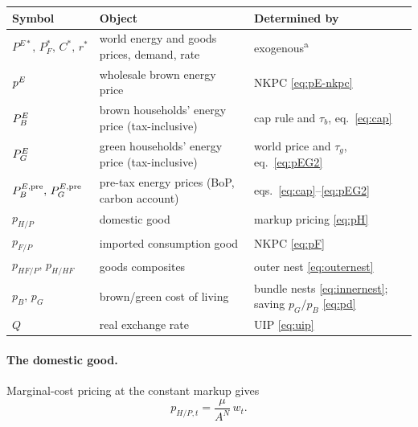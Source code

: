 \begin{table}[H]
\centering
{}
\small
\begin{tabular}{lll}
\toprule
Symbol & Object & Determined by \\
\midrule
$P^{E*},\,P^{*}_F,\,C^{*},\,r^{*}$ & world energy and goods prices, demand, rate &
exogenous\textsuperscript{a} \\
$p^{E}$ & wholesale brown energy price & NKPC \eqref{eq:pE-nkpc} \\
$P^{E}_{B}$ & brown households' energy price (tax-inclusive) & cap rule and $\tau_b$, eq.~\eqref{eq:cap} \\
$P^{E}_{G}$ & green households' energy price (tax-inclusive) & world price and $\tau_g$, eq.~\eqref{eq:pEG2} \\
$P^{E,\mathrm{pre}}_{B},\,P^{E,\mathrm{pre}}_{G}$ & pre-tax energy prices (BoP, carbon account) & eqs.~\eqref{eq:cap}--\eqref{eq:pEG2} \\
$p_{H/P}$ & domestic good & markup pricing \eqref{eq:pH} \\
$p_{F/P}$ & imported consumption good & NKPC \eqref{eq:pF} \\
$p_{HF/P},\,p_{H/HF}$ & goods composites & outer nest \eqref{eq:outernest} \\
$p_B,\,p_G$ & brown/green cost of living & bundle nests \eqref{eq:innernest};
saving $p_G/p_B$ \eqref{eq:pd} \\
$Q$ & real exchange rate & UIP \eqref{eq:uip} \\
\bottomrule
\end{tabular}
\label{tab:prices}
\end{table}

\paragraph{The domestic good.}
Marginal-cost pricing at the constant markup gives
%
\begin{equation}
p_{H/P,t}=\frac{\mu}{A^N}\,w_t.
\label{eq:pH}
\end{equation}


